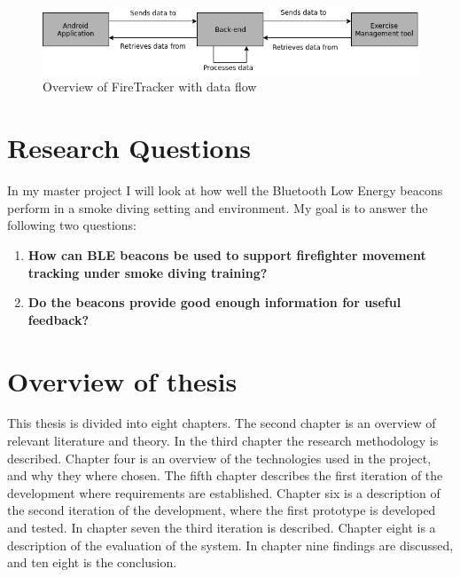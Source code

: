 \documentclass[../Main/thesis.tex]{subfiles}
\begin{document}
\begin{figure}[h]
	\centering
	\includegraphics[width=\textwidth]{../fig/system-overview}
	\caption{Overview of FireTracker with data flow}
	\label{fig:system-overview}
\end{figure}

\section{Research Questions}
\label{ch:reserch_questions}
In my master project I will look at how well the Bluetooth Low Energy beacons perform in a smoke diving setting and environment. 
My goal is to answer the following two questions:

\begin{enumerate}
	\item \textbf{How can BLE beacons be used to support firefighter movement tracking under smoke diving training?}
	\item \textbf{Do the beacons provide good enough information for useful feedback?}
\end{enumerate}


\section{Overview of thesis}
This thesis is divided into eight chapters.
The second chapter is an overview of relevant literature and theory.
In the third chapter the research methodology is described.
Chapter four is an overview of the technologies used in the project, and why they where chosen.
The fifth chapter describes the first iteration of the development where requirements are established.
Chapter six is a description of the second iteration of the development, where the first prototype is developed and tested.
In chapter seven the third iteration is described.
Chapter eight is a description of the evaluation of the system.
In chapter nine findings are discussed, and ten eight is the conclusion.


\blankpage

\onlyinsubfile{}
\onlyinsubfile{}
\end{document}
